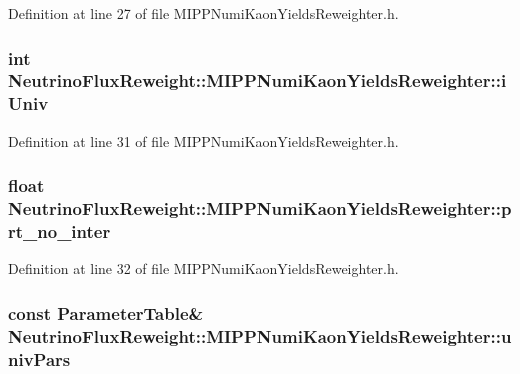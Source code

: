 Definition at line 27 of file M\-I\-P\-P\-Numi\-Kaon\-Yields\-Reweighter.\-h.

\hypertarget{class_neutrino_flux_reweight_1_1_m_i_p_p_numi_kaon_yields_reweighter_a22da7248cf883c4d01c486e6763dd3bc}{
\subsubsection[{i\-Univ}]{\setlength{\rightskip}{0pt plus 5cm}int Neutrino\-Flux\-Reweight\-::\-M\-I\-P\-P\-Numi\-Kaon\-Yields\-Reweighter\-::i\-Univ\hspace{0.3cm}{\ttfamily [private]}}}\label{class_neutrino_flux_reweight_1_1_m_i_p_p_numi_kaon_yields_reweighter_a22da7248cf883c4d01c486e6763dd3bc}


Definition at line 31 of file M\-I\-P\-P\-Numi\-Kaon\-Yields\-Reweighter.\-h.

\hypertarget{class_neutrino_flux_reweight_1_1_m_i_p_p_numi_kaon_yields_reweighter_ad0e1b0e610a8d647d0be6d97e80327fa}{
\subsubsection[{prt\-\_\-no\-\_\-inter}]{\setlength{\rightskip}{0pt plus 5cm}float Neutrino\-Flux\-Reweight\-::\-M\-I\-P\-P\-Numi\-Kaon\-Yields\-Reweighter\-::prt\-\_\-no\-\_\-inter\hspace{0.3cm}{\ttfamily [private]}}}\label{class_neutrino_flux_reweight_1_1_m_i_p_p_numi_kaon_yields_reweighter_ad0e1b0e610a8d647d0be6d97e80327fa}


Definition at line 32 of file M\-I\-P\-P\-Numi\-Kaon\-Yields\-Reweighter.\-h.

\hypertarget{class_neutrino_flux_reweight_1_1_m_i_p_p_numi_kaon_yields_reweighter_aef5aab54416e696526aa8ae2c92d1fd8}{
\subsubsection[{univ\-Pars}]{\setlength{\rightskip}{0pt plus 5cm}const {\bf Parameter\-Table}\& Neutrino\-Flux\-Reweight\-::\-M\-I\-P\-P\-Numi\-Kaon\-Yields\-Reweighter\-::univ\-Pars}}\label{class_neutrino_flux_reweight_1_1_m_i_p_p_numi_kaon_yields_reweighter_aef5aab54416e696526aa8ae2c92d1fd8}



